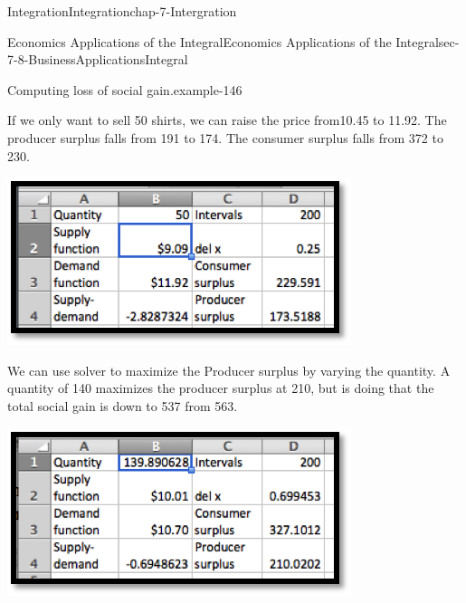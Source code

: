 \documentclass[oneside,10pt,]{book}
\numberwithin{equation}{section}
\begin{document}
\begin{chapterptx}{Integration}{}{Integration}{}{}{chap-7-Intergration}
\begin{sectionptx}{Economics Applications of the Integral}{}{Economics Applications of the Integral}{}{}{sec-7-8-BusinessApplicationsIntegral}
\begin{example}{Computing loss of social gain.}{example-146}
\begin{sidebyside}{1}{0.25}{0.25}{0}
\begin{sbspanel}{0.5}
\end{sbspanel}%
\end{sidebyside}%
\par
\hypertarget{p-3105}{}%
If we only want to sell 50 shirts, we can raise the price from\textdollar{}10.45 to \textdollar{}11.92.  The producer surplus falls from \textdollar{}191 to \textdollar{}174.  The consumer surplus falls from \textdollar{}372 to \textdollar{}230.%
\begin{sidebyside}{1}{0.25}{0.25}{0}%
\begin{sbspanel}{0.5}%
\includegraphics[width=1\linewidth]{images/sec7-8-12.png}
\end{sbspanel}%
\end{sidebyside}%
\par
\hypertarget{p-3106}{}%
We can use solver to maximize the Producer surplus by varying the quantity.  A quantity of 140 maximizes the producer surplus at \textdollar{}210, but is doing that the total social gain is down to \textdollar{}537 from \textdollar{}563.%
\begin{sidebyside}{1}{0.25}{0.25}{0}%
\begin{sbspanel}{0.5}%
\includegraphics[width=1\linewidth]{images/sec7-8-13.png}
\end{sbspanel}%
\end{sidebyside}%

\end{example}
\end{sectionptx}
\end{chapterptx}
\end{document}
